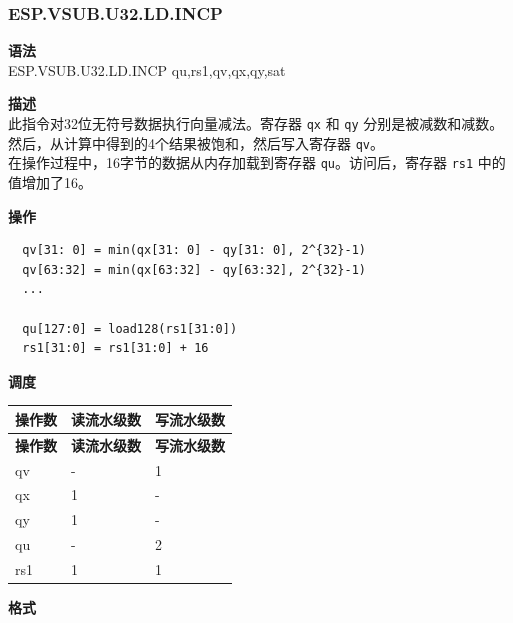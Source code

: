\newpage

\newpage
\subsubsection{ESP.VSUB.U32.LD.INCP}\label{instruction:ESPVSUBU32LDINCP}
\textbf{语法}\\
ESP.VSUB.U32.LD.INCP qu,rs1,qv,qx,qy,sat

\textbf{描述}\\
此指令对32位无符号数据执行向量减法。寄存器 \lstinline{qx} 和 \lstinline{qy} 分别是被减数和减数。然后，从计算中得到的4个结果被饱和，然后写入寄存器 \lstinline{qv}。\\ 在操作过程中，16字节的数据从内存加载到寄存器 \lstinline{qu}。访问后，寄存器 \lstinline{rs1} 中的值增加了16。

\textbf{操作}\\
\begin{lstlisting}
  qv[31: 0] = min(qx[31: 0] - qy[31: 0], 2^{32}-1)
  qv[63:32] = min(qx[63:32] - qy[63:32], 2^{32}-1)
  ...

  qu[127:0] = load128(rs1[31:0])
  rs1[31:0] = rs1[31:0] + 16
\end{lstlisting}

\textbf{调度}\\
\begin{longtable}[c]{|l|l|l|}
    \hline
    \rowcolor{lightgray}
    \textbf{操作数} & \textbf{读流水级数} & \textbf{写流水级数} \\\hline
    \endfirsthead
    \hline
    \rowcolor{lightgray}
     \textbf{操作数} & \textbf{读流水级数} & \textbf{写流水级数} \\\hline
    \endhead
    \hline
    \endfoot

  qv & - & 1 \\\hline
    qx & 1 & - \\\hline
    qy & 1 & - \\\hline
    qu & - & 2 \\\hline
    rs1 & 1 & 1

\end{longtable}

\textbf{格式}\\

